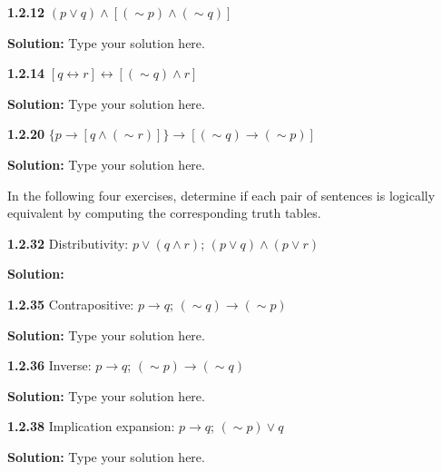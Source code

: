 \documentclass[12pt]{article}
\begin{document}
\noindent\textbf{1.2.12} $(p\vee q)\wedge[(\sim p)\wedge(\sim q)]$

\doublespacing
\textbf{Solution:} Type your solution here.

\singlespacing
\vspace{12pt}

\noindent\textbf{1.2.14} $[q\leftrightarrow r]\leftrightarrow[(\sim q)\wedge r]$

\doublespacing
\textbf{Solution:} Type your solution here.

\singlespacing
\vspace{12pt}

\noindent\textbf{1.2.20} $\{p\rightarrow[q\wedge(\sim r)]\}\rightarrow[(\sim q)\rightarrow(\sim p)]$

\doublespacing
\textbf{Solution:} Type your solution here.

\singlespacing
\vspace{12pt}

\newpage

In the following four exercises, determine if each pair of sentences is logically equivalent by computing the corresponding truth tables.  

\vspace{12pt}

\noindent\textbf{1.2.32} Distributivity: $p\vee(q\wedge r)$; $(p\vee q)\wedge(p\vee r)$

\doublespacing
\textbf{Solution:} 

\singlespacing
\vspace{12pt}

\noindent\textbf{1.2.35} Contrapositive: $p\rightarrow q$; $(\sim q)\rightarrow(\sim p)$

\doublespacing
\textbf{Solution:} Type your solution here.

\singlespacing
\vspace{12pt}

\noindent\textbf{1.2.36} Inverse: $p\rightarrow q$; $(\sim p)\rightarrow(\sim q)$

\doublespacing
\textbf{Solution:} Type your solution here.

\singlespacing
\vspace{12pt}

\noindent\textbf{1.2.38} Implication expansion: $p\rightarrow q$; $(\sim p)\vee q$

\doublespacing
\textbf{Solution:} Type your solution here.

\singlespacing
\vspace{12pt}
\end{document}

